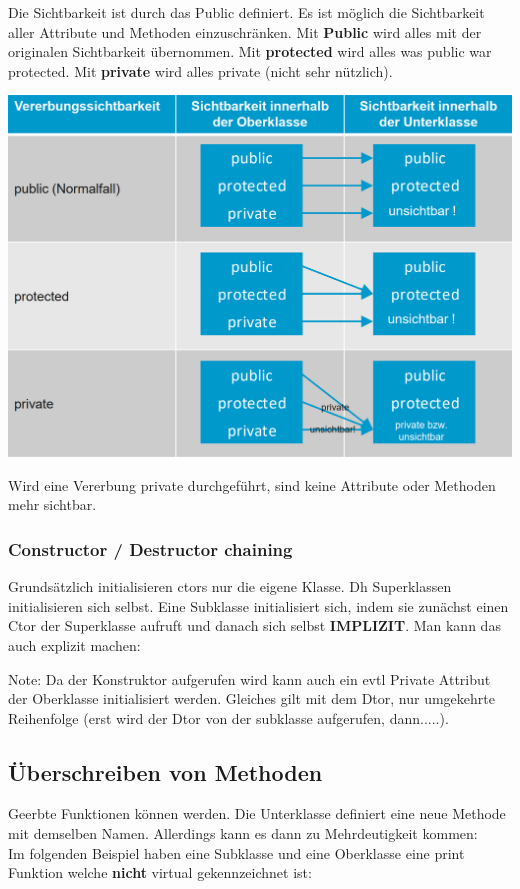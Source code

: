 Die Sichtbarkeit ist durch das Public definiert. 
Es ist möglich die Sichtbarkeit aller Attribute und Methoden einzuschränken. 
Mit \textbf{Public} wird alles mit der originalen Sichtbarkeit übernommen. 
Mit \textbf{protected} wird alles was public war protected. 
Mit \textbf{private} wird alles private (nicht sehr nützlich).

\begin{center}
    \includegraphics[width=0.7\columnwidth]{pictures/Vererbung.png}    
\end{center}

Wird eine Vererbung private durchgeführt, sind keine Attribute oder Methoden mehr sichtbar.

\subsubsection{Constructor / Destructor chaining}

Grundsätzlich initialisieren ctors nur die eigene Klasse. 
Dh Superklassen initialisieren sich selbst. 
Eine Subklasse initialisiert sich, indem sie zunächst einen Ctor der Superklasse aufruft und danach sich selbst \textbf{IMPLIZIT}. 
Man kann das auch explizit machen:



Note: Da der Konstruktor aufgerufen wird kann auch ein evtl Private Attribut der Oberklasse initialisiert werden.
Gleiches gilt mit dem Dtor, nur umgekehrte Reihenfolge (erst wird der Dtor von der subklasse aufgerufen, dann.....).

\subsection{Überschreiben von Methoden}

Geerbte Funktionen können  werden. 
Die Unterklasse definiert eine neue Methode mit demselben Namen.
Allerdings kann es dann zu Mehrdeutigkeit kommen:\\
Im folgenden Beispiel haben eine Subklasse und eine Oberklasse eine print Funktion welche \textbf{nicht} virtual gekennzeichnet ist:

